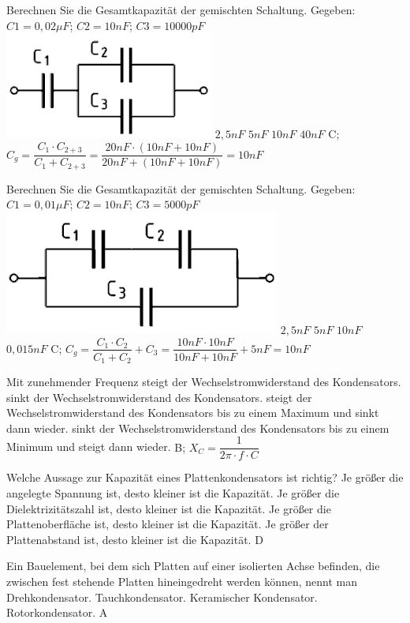 {
Berechnen Sie die Gesamtkapazität der gemischten Schaltung. Gegeben: $C1 = 0,02\mu F$; $C2 = 10nF$; $C3 = 10000pF $ \\
\includegraphics[scale=0.35]{TD106.png}
}%
{$2,5nF$}%
{$5nF$}%
{$10nF$}%
{$40nF$}%
{C; $C_g = \dfrac{C_1 \cdot C_{2+3}}{C_1 + C_{2+3}} = \dfrac{20nF \cdot (10nF + 10nF)}{20nF + (10nF + 10nF)} = 10nF$}%

{
Berechnen Sie die Gesamtkapazität der gemischten Schaltung. Gegeben: $C1 = 0,01 \mu F$; $C2 = 10 nF$; $C3 = 5000 pF$\\
\includegraphics[scale=0.3]{TD107.png}
}%
{$2,5 nF$}%
{$5 nF$}%
{$10 nF$}%
{$0,015 nF$}%
{C; $C_g = \dfrac{C_1 \cdot C_2}{C_1 + C_2} + C_3 = \dfrac{10nF \cdot 10nF}{10nF + 10nF} + 5nF = 10nF$}%

{Mit zunehmender Frequenz}%
{steigt der Wechselstromwiderstand des Kondensators.}%
{sinkt der Wechselstromwiderstand des Kondensators.}%
{steigt der Wechselstromwiderstand des Kondensators bis zu einem Maximum und sinkt dann wieder.}%
{sinkt der Wechselstromwiderstand des Kondensators bis zu einem Minimum und steigt dann wieder.}%
{B; $X_C = \dfrac{1}{2\pi \cdot f \cdot C}$}%


{Welche Aussage zur Kapazität eines Plattenkondensators ist richtig?}%
{Je größer die angelegte Spannung ist, desto kleiner ist die Kapazität.}%
{Je größer die Dielektrizitätszahl ist, desto kleiner ist die Kapazität.}%
{Je größer die Plattenoberfläche ist, desto kleiner ist die Kapazität.}%
{Je größer der Plattenabstand ist, desto kleiner ist die Kapazität.}%
{D}%

{Ein Bauelement, bei dem sich Platten auf einer isolierten Achse befinden, die zwischen fest stehende Platten hineingedreht werden können, nennt man}%
{Drehkondensator.}%
{Tauchkondensator.}%
{Keramischer Kondensator.}%
{Rotorkondensator.}%
{A}%

